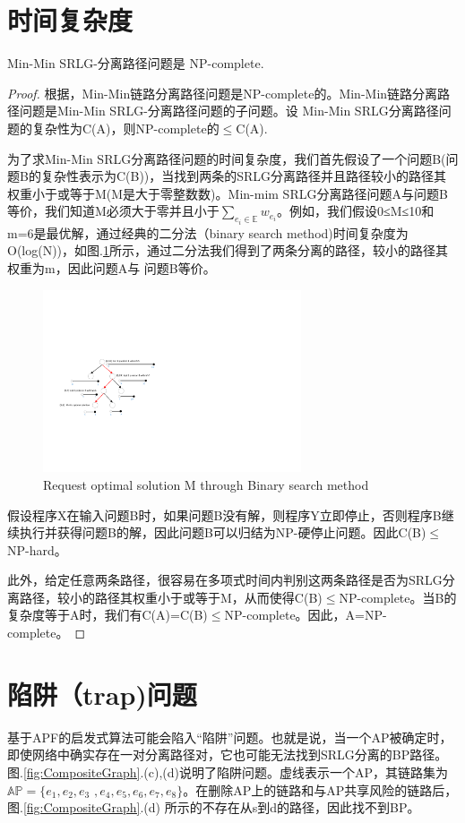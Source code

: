 \section{时间复杂度}
\begin{theorem}
\label{le:lemma1}
    Min-Min SRLG-分离路径问题是 NP-complete.
\end{theorem}
\begin{proof}
根据\cite{bhatia2006finding}，Min-Min链路分离路径问题是NP-complete的。Min-Min链路分离路径问题是Min-Min SRLG-分离路径问题的子问题。设
Min-Min SRLG分离路径问题的复杂性为C(A)，则NP-complete的$\leq$C(A).

为了求Min-Min SRLG分离路径问题的时间复杂度，我们首先假设了一个问题B(问题B的复杂性表示为C(B))，当找到两条的SRLG分离路径并且路径较小的路径其权重小于或等于M(M是大于零整数数)。Min-mim SRLG分离路径问题A与问题B等价，我们知道M必须大于零并且小于$\sum\limits_{e_i\in \mathbb{E}}w_{e_i}$。例如，我们假设0≤M≤10和m=6是最优解，通过经典的二分法（binary search method)时间复杂度为O(log(N))，如图.\ref{fig:binarySearch}所示，通过二分法我们得到了两条分离的路径，较小的路径其权重为m，因此问题A与 问题B等价。
\begin{figure}[htp]
  \centering
  \includegraphics[width=3.0in]{figures/binarySearch}
  \caption{Request optimal solution M through Binary search method }
  \label{fig:binarySearch}
\end{figure}
假设程序X在输入问题B时，如果问题B没有解，则程序Y立即停止，否则程序B继续执行并获得问题B的解，因此问题B可以归结为NP-硬停止问题。因此C(B)$\leq$NP-hard。

此外，给定任意两条路径，很容易在多项式时间内判别这两条路径是否为SRLG分离路径，较小的路径其权重小于或等于M，从而使得C(B)$\leq$NP-complete。当B的复杂度等于A时，我们有C(A)=C(B)$\leq$NP-complete。因此，A=NP-complete。
\end{proof}
\section{陷阱（trap)问题}
基于APF的启发式算法可能会陷入“陷阱”问题。也就是说，当一个AP被确定时，即使网络中确实存在一对分离路径对，它也可能无法找到SRLG分离的BP路径。图.\ref{fig:CompositeGraph}.(c),(d)说明了陷阱问题。虚线表示一个AP，其链路集为$\mathbb{AP}=\{e_1,e_2,e_3$ $,e_4,e_5,e_6,e_7,e_8\}$。在删除AP上的链路和与AP共享风险的链路后，图.\ref{fig:CompositeGraph}.(d) 所示的不存在从s到d的路径，因此找不到BP。

